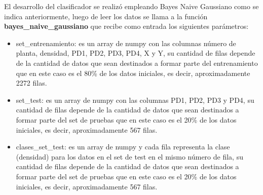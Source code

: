 El desarrollo del clasificador se realizó empleando Bayes Naive Gaussiano como se indica anteriormente, luego de leer los datos se llama a la función
\textbf{bayes\_naive\_gaussiano} que recibe como entrada los siguientes parámetros:
\begin{itemize}
	\item{set\_entrenamiento: es un array de numpy con las columnas número de planta, densidad, PD1, PD2, PD3, PD4, X y Y, su
	cantidad de filas depende de la cantidad de datos que sean destinados a formar parte del entrenamiento que en este caso es
	el 80\% de los datos iniciales, es decir, aproximadamente 2272 filas.}
	\item{set\_test: es un array de numpy con las columnas PD1, PD2, PD3 y PD4, su cantidad de filas depende de la cantidad de
	datos que sean destinados a formar parte del set de pruebas que en este caso es el 20\% de los datos iniciales, es decir,
	aproximadamente 567 filas.}
	\item{clases\_set\_test: es un array de numpy y cada fila representa la clase (densidad) para los datos en el set de test
	en el mismo número de fila, su cantidad de filas depende de la cantidad de datos que sean destinados a formar parte del set
	de pruebas que en este caso es el 20\% de los datos iniciales, es decir, aproximadamente 567 filas.}
\end{itemize}

